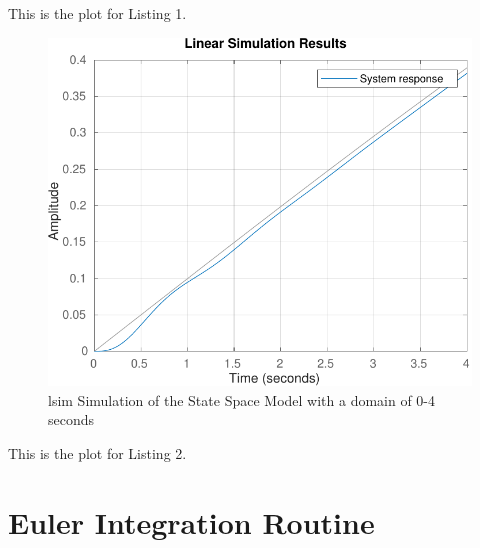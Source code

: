 \documentclass[12pt]{article}
\begin{document}
		This is the plot for Listing 1.
		\begin{figure}[H]
			\centering
			\includegraphics[width=1\linewidth]{"Code/Fig/lsim_run_4s.pdf"}
			\caption{lsim Simulation of the State Space Model with a domain of 0-4 seconds}
			\label{fig:lsimrun4s}
		\end{figure}
		This is the plot for Listing 2.
		\newpage
	\section{Euler Integration Routine}
		
		
		
		
		
			
\end{document}
